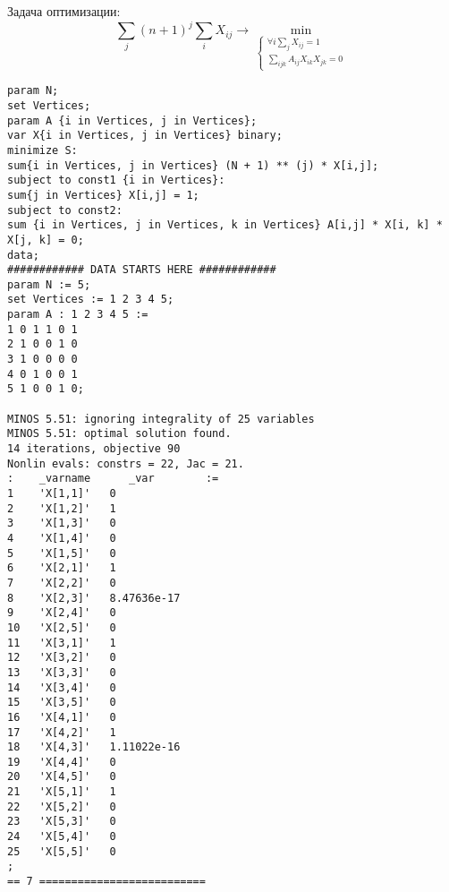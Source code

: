 \documentclass[a4paper]{article}
\begin{document}
Задача оптимизации:
$$
\sum\limits_j (n+1)^j \sum_i X_{ij}\to\min\limits_{
\begin{cases}
\forall i \sum\limits_j X_{ij}=1\\
\sum\limits_{ijk}A_{ij}X_{ik}X_{jk}=0
\end{cases}}
$$
\begin{verbatim}
param N;
set Vertices;
param A {i in Vertices, j in Vertices};
var X{i in Vertices, j in Vertices} binary;
minimize S:
sum{i in Vertices, j in Vertices} (N + 1) ** (j) * X[i,j];
subject to const1 {i in Vertices}:
sum{j in Vertices} X[i,j] = 1;
subject to const2:
sum {i in Vertices, j in Vertices, k in Vertices} A[i,j] * X[i, k] * X[j, k] = 0;
data;
############ DATA STARTS HERE ############
param N := 5;
set Vertices := 1 2 3 4 5;
param A : 1 2 3 4 5 :=
1 0 1 1 0 1
2 1 0 0 1 0
3 1 0 0 0 0
4 0 1 0 0 1
5 1 0 0 1 0;

MINOS 5.51: ignoring integrality of 25 variables
MINOS 5.51: optimal solution found.
14 iterations, objective 90
Nonlin evals: constrs = 22, Jac = 21.
:    _varname      _var        :=
1    'X[1,1]'   0
2    'X[1,2]'   1
3    'X[1,3]'   0
4    'X[1,4]'   0
5    'X[1,5]'   0
6    'X[2,1]'   1
7    'X[2,2]'   0
8    'X[2,3]'   8.47636e-17
9    'X[2,4]'   0
10   'X[2,5]'   0
11   'X[3,1]'   1
12   'X[3,2]'   0
13   'X[3,3]'   0
14   'X[3,4]'   0
15   'X[3,5]'   0
16   'X[4,1]'   0
17   'X[4,2]'   1
18   'X[4,3]'   1.11022e-16
19   'X[4,4]'   0
20   'X[4,5]'   0
21   'X[5,1]'   1
22   'X[5,2]'   0
23   'X[5,3]'   0
24   'X[5,4]'   0
25   'X[5,5]'   0
;
== 7 ==========================
\end{verbatim}
\end{document}
